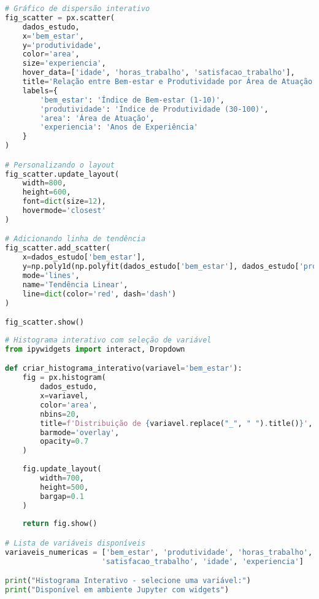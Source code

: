 \begin{pythonbox}
\begin{lstlisting}[language=Python]
# Gráfico de dispersão interativo
fig_scatter = px.scatter(
    dados_estudo, 
    x='bem_estar', 
    y='produtividade',
    color='area',
    size='experiencia',
    hover_data=['idade', 'horas_trabalho', 'satisfacao_trabalho'],
    title='Relação entre Bem-estar e Produtividade por Área de Atuação',
    labels={
        'bem_estar': 'Índice de Bem-estar (1-10)',
        'produtividade': 'Índice de Produtividade (30-100)',
        'area': 'Área de Atuação',
        'experiencia': 'Anos de Experiência'
    }
)

# Personalizando o layout
fig_scatter.update_layout(
    width=800,
    height=600,
    font=dict(size=12),
    hovermode='closest'
)

# Adicionando linha de tendência
fig_scatter.add_scatter(
    x=dados_estudo['bem_estar'],
    y=np.poly1d(np.polyfit(dados_estudo['bem_estar'], dados_estudo['produtividade'], 1))(dados_estudo['bem_estar']),
    mode='lines',
    name='Tendência Linear',
    line=dict(color='red', dash='dash')
)

fig_scatter.show()
\end{lstlisting}
\end{pythonbox}

\begin{pythonbox}
\begin{lstlisting}[language=Python]
# Histograma interativo com seleção de variável
from ipywidgets import interact, Dropdown

def criar_histograma_interativo(variavel='bem_estar'):
    fig = px.histogram(
        dados_estudo, 
        x=variavel,
        color='area',
        nbins=20,
        title=f'Distribuição de {variavel.replace("_", " ").title()}',
        barmode='overlay',
        opacity=0.7
    )
    
    fig.update_layout(
        width=700,
        height=500,
        bargap=0.1
    )
    
    return fig.show()

# Lista de variáveis disponíveis
variaveis_numericas = ['bem_estar', 'produtividade', 'horas_trabalho', 
                      'satisfacao_trabalho', 'idade', 'experiencia']

print("Histograma Interativo - selecione uma variável:")
print("Disponível em ambiente Jupyter com widgets")
\end{lstlisting}
\end{pythonbox}

